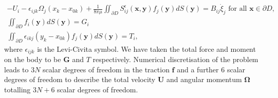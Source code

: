 \begin{equation}
\label{eq:swimmingProblem}
\begin{gathered}
    -U_{i}-\epsilon_{i j k} \Omega_{j}\left(x_{k}-x_{0 k}\right)+\frac{1}{8 \pi\mu} \iint_{\partial D} S_{i j}^{\epsilon}(\bm{x}, \bm{y}) f_{j}(\bm{y}) d S({\bm{y}})=B_{i j} \dot{\xi}_{j} \text { for all } \bm{x} \in \partial D, \\
    \iint_{\partial D} f_{i}(\bm{y}) d S({\bm{y}})=G_i \\
    \iint_{\partial D} \epsilon_{i k j} (y_{k}-x_{0 k}) f_{j}(\bm{y}) d S({\bm{y}})=T_i,
\end{gathered}
\end{equation}
where $\epsilon_{ijk}$ is the Levi-Civita symbol. We have taken the total force and moment on the body to be $\bm{G}$ and $T$ respectively. Numerical discretisation of the problem leads to $3N$ scalar degrees of freedom in the traction $\bm{f}$ and a further $6$ scalar degrees of freedom to describe the total velocity $\bm{U}$ and angular momentum $\bm{\Omega}$ totalling $3N+6$ scalar degrees of freedom.

